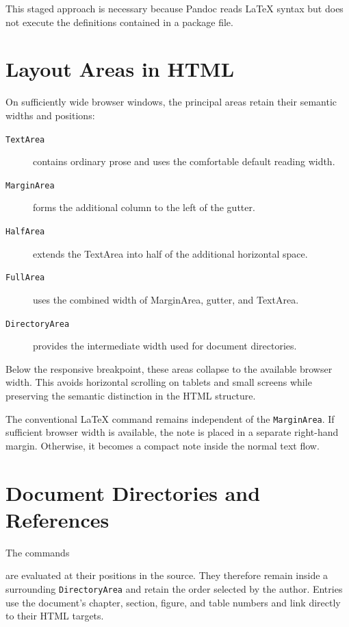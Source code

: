 \documentclass[
11pt,
a4paper,
oneside
]{scrbook}
\begin{document}
This staged approach is necessary because Pandoc reads \LaTeX{} syntax but does
not execute the definitions contained in a package file.

\section{Layout Areas in HTML}

On sufficiently wide browser windows, the principal \MDWordmark areas retain
their semantic widths and positions:

\begin{description}
	\item[\texttt{TextArea}]
	contains ordinary prose and uses the comfortable default reading width.

	\item[\texttt{MarginArea}]
	forms the additional column to the left of the gutter.

	\item[\texttt{HalfArea}]
	extends the TextArea into half of the additional horizontal space.

	\item[\texttt{FullArea}]
	uses the combined width of MarginArea, gutter, and TextArea.

	\item[\texttt{DirectoryArea}]
	provides the intermediate width used for document directories.
\end{description}

Below the responsive breakpoint, these areas collapse to the available browser
width. This avoids horizontal scrolling on tablets and small screens while
preserving the semantic distinction in the HTML structure.

The conventional \LaTeX{} command  remains independent of the
\MDWordmark \texttt{MarginArea}. If sufficient browser width is available, the
note is placed in a separate right-hand margin. Otherwise, it becomes a compact
note inside the normal text flow.

\section{Document Directories and References}

The commands






are evaluated at their positions in the source. They therefore remain inside a
surrounding \texttt{DirectoryArea} and retain the order selected by the author.
Entries use the document's chapter, section, figure, and table numbers and link
directly to their HTML targets.
\end{document}

